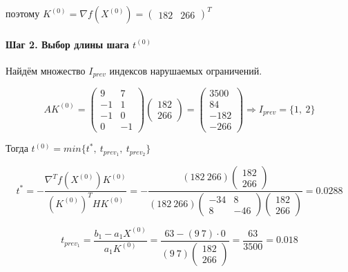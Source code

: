 поэтому $K^{(0)} = \nabla f(X^{(0)}) = \begin{pmatrix}
	182 & 266
	\end{pmatrix}^T$

\paragraph{Шаг 2. Выбор длины шага $t^{(0)}$}

Найдём множество $I_{prev}$ индексов нарушаемых ограничений.

\begin{equation*}
	A K^{(0)} = \begin{pmatrix}
		9 & 7
		\\
		-1 & 1
		\\
		-1 & 0
		\\
		0 & -1
	\end{pmatrix}
	\begin{pmatrix}
		182 \\ 266
	\end{pmatrix}
	=
	\begin{pmatrix}
		3500 \\ 84 \\ -182 \\ -266
	\end{pmatrix}
	\Rightarrow I_{prev} = \{1,\ 2\}
\end{equation*}

Тогда $t^{(0)} = min\{t^*,\ t_{prev_1},\ t_{prev_2}\}$

\begin{equation*}
	t^* = -\frac{\nabla^T f(X^{(0)}) K^{(0)}}{(K^{(0)})^T H K^{(0)}} = -\frac{(182\ 266) \begin{pmatrix} 182 \\ 266 \end{pmatrix}}{(182\ 266) \begin{pmatrix} -34 & 8 \\ 8 & -46 \end{pmatrix} \begin{pmatrix} 182 \\ 266 \end{pmatrix}} = 0.0288
\end{equation*}

\begin{equation*}
	t_{prev_1} = \frac{b_1 - a_1 X^{(0)}}{a_1 K^{(0)}} = \frac{63 - (9\ 7) \cdot 0}{(9\ 7) \begin{pmatrix} 182 \\ 266 \end{pmatrix}} = \frac{63}{3500} = 0.018
\end{equation*}

